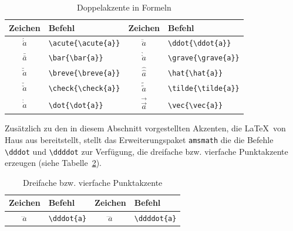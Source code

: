 \documentclass[a4paper,10pt,twoside]{scrbook}
\begin{document}
\begin{table}[h!tb]
\centering
\caption{Doppelakzente in Formeln}
\label{Tabelle_Doppelakzente_Formeln}       %
\begin{tabular}{clcl}
\hline
Zeichen & Befehl & Zeichen & Befehl  \\
\hline
$\acute{\acute{a}}$ & \texttt{\textbackslash acute\{\textbackslash acute\{a\}\}} & 
$\ddot{\ddot{a}}$ & \texttt{\textbackslash ddot\{\textbackslash ddot\{a\}\}} \\
$\bar{\bar{a}}$ & \texttt{\textbackslash bar\{\textbackslash bar\{a\}\}} &
$\grave{\grave {a}}$ & \texttt{\textbackslash grave\{\textbackslash grave\{a\}\}} \\
$\breve{\breve {a}}$ & \texttt{\textbackslash breve\{\textbackslash breve\{a\}\}} &
$\hat{\hat {a}}$ & \texttt{\textbackslash hat\{\textbackslash hat\{a\}\}} \\
$\check{\check {a}}$ & \texttt{\textbackslash check\{\textbackslash check\{a\}\}} &
$\tilde{\tilde {a}}$ & \texttt{\textbackslash tilde\{\textbackslash tilde\{a\}\}} \\
$\dot{\dot {a}}$ & \texttt{\textbackslash dot\{\textbackslash dot\{a\}\}} &
$\vec{\vec {a}}$ & \texttt{\textbackslash vec\{\textbackslash vec\{a\}\}} \\
\hline
\end{tabular}
\end{table}

Zusätzlich zu den in diesem Abschnitt 
vorgestellten Akzenten, die \LaTeX\ von
Haus aus bereitstellt, stellt das Erweiterungspaket \verb!amsmath! 
die die Befehle \verb!\dddot! 
und \verb!\ddddot! zur Verfügung, die 
dreifache bzw. vierfache Punktakzente erzeugen (siehe Tabelle~\ref{Tabelle_Akzente_amsmath}). 


\begin{table}[h!tb]
\centering
\caption{Dreifache bzw. vierfache Punktakzente}
\label{Tabelle_Akzente_amsmath}       %
\begin{tabular}{clcl}
\hline
Zeichen & Befehl & Zeichen & Befehl  \\
\hline
$\dddot{a}$ & \texttt{\textbackslash dddot\{a\}} & 
$\ddddot{a}$ & \texttt{\textbackslash ddddot\{a\}} \\
\hline
\end{tabular}
\end{table}
\end{document}
